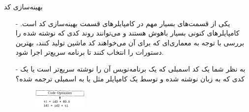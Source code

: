 \begin{frame}{بهینه‌سازی کد }
\begin{itemize}\itemr
\item[-]
یکی از قسمت‌های بسیار مهم در کامپایلر‌های قسمت بهینه‌سازی کد است. کامپایلر‌های کنونی بسیار باهوش هستند و می‌توانند روند کدی که نوشته شده را بررسی با توجه به 
معماری‌ای که برای آن می‌خواهند کد ماشین تولید کنند، بهترین دستورات را انتخاب کنند تا برنامه سریع‌تر اجرا شود.

\item[-]
به نظر شما یک کد اسمبلی که یک برنامه‌نویس آن را نوشته سریع‌تر است یا یک کدی که به زبان 
نوشته شده و توسط یک کامپایلر مثل 
یا 
به اسمبلی ترجمه شده؟
\vspace{6mm}
\begin{figure}[H]
\begin{center}
\includegraphics[width=0.25\textwidth, height=0.31\textheight, angle=1]{docs/images/optimizer}
\end{center}
\end{figure}
\end{itemize}
\end{frame}
